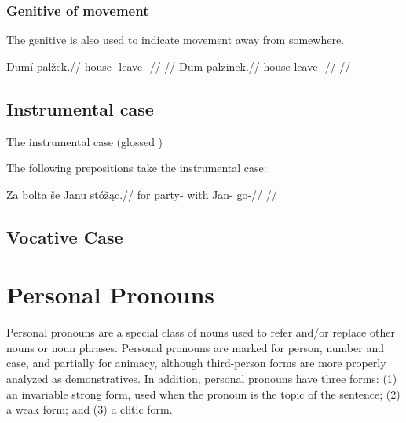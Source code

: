 \subsubsection{Genitive of movement}

The genitive is also used to indicate movement away from somewhere.

\pex
\a
\begingl
\gla Dumí palžek.//
\glb house-\Gen{} leave-\Av{}-\Pf{}//
\glft {}//
\endgl
\a
\begingl
\gla Dum palzinek.//
\glb house leave-\Pv{}-\Pf{}//
\glft {}//
\endgl
\xe

\subsection{Instrumental case}

The instrumental case (glossed \Ins{})

The following prepositions take the instrumental case:  

\pex
\begingl
\gla Za bolta še Janu stóž\k{a}c.//
\glb for party-\Acc{} with Jan-\Ins{} go-//
\glft {}//
\endgl
\xe


\subsection{Vocative Case}



\section{Personal Pronouns}

Personal pronouns are a special class of nouns used to refer and/or replace other nouns or noun phrases. Personal pronouns are marked for person, number and case, and partially for animacy, although third-person forms are more properly analyzed as demonstratives. In addition, personal pronouns have three forms: (1) an invariable strong form, used when the pronoun is the topic of the sentence; (2) a weak form; and (3) a clitic form.

